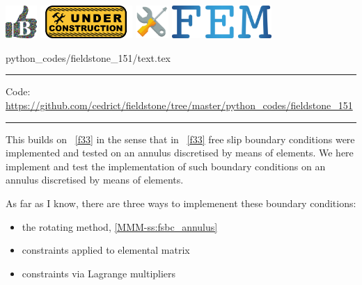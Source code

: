\includegraphics[height=1.25cm]{images/pictograms/benchmark}
\includegraphics[height=1.25cm]{images/pictograms/under_construction}
\includegraphics[height=1.25cm]{images/pictograms/tools}
\includegraphics[height=1.25cm]{images/pictograms/FEM}


\begin{flushright} {\tiny {\color{gray} python\_codes/fieldstone\_151/text.tex}} \end{flushright}



\par\noindent\rule{\textwidth}{0.4pt}

\begin{center}
\inpython
{\small Code: \url{https://github.com/cedrict/fieldstone/tree/master/python_codes/fieldstone_151}}
\end{center}

\par\noindent\rule{\textwidth}{0.4pt}



This \stone builds on \stone~\ref{f33} in the sense that in \stone~\ref{f33} free slip boundary conditions 
were implemented and tested on an annulus discretised by means of \QonePzero elements. 
We here implement and test the implementation of such boundary conditions on an annulus discretised
by means of \QtwoQone elements.

As far as I know, there are three ways to implemenent these boundary conditions:
\begin{itemize}
\item the rotating method, \ref{MMM-ss:fsbc_annulus} 
\item constraints applied to elemental matrix
\item constraints via Lagrange multipliers
\end{itemize}



